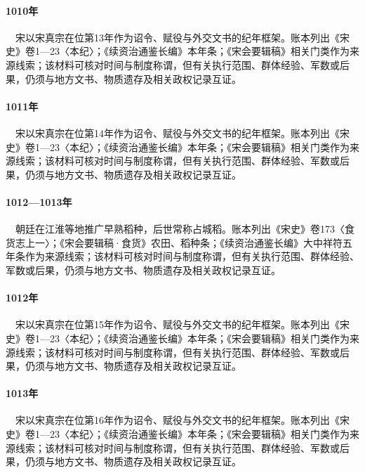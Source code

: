 \paragraph{1010年}　宋以宋真宗在位第13年作为诏令、赋役与外交文书的纪年框架。账本列出《宋史》卷1—23〈本纪〉；《续资治通鉴长编》本年条；《宋会要辑稿》相关门类作为来源线索；该材料可核对时间与制度称谓，但有关执行范围、群体经验、军数或后果，仍须与地方文书、物质遗存及相关政权记录互证。

\paragraph{1011年}　宋以宋真宗在位第14年作为诏令、赋役与外交文书的纪年框架。账本列出《宋史》卷1—23〈本纪〉；《续资治通鉴长编》本年条；《宋会要辑稿》相关门类作为来源线索；该材料可核对时间与制度称谓，但有关执行范围、群体经验、军数或后果，仍须与地方文书、物质遗存及相关政权记录互证。

\paragraph{1012—1013年}　朝廷在江淮等地推广早熟稻种，后世常称占城稻。账本列出《宋史》卷173〈食货志上一〉；《宋会要辑稿·食货》农田、稻种条；《续资治通鉴长编》大中祥符五年条作为来源线索；该材料可核对时间与制度称谓，但有关执行范围、群体经验、军数或后果，仍须与地方文书、物质遗存及相关政权记录互证。

\paragraph{1012年}　宋以宋真宗在位第15年作为诏令、赋役与外交文书的纪年框架。账本列出《宋史》卷1—23〈本纪〉；《续资治通鉴长编》本年条；《宋会要辑稿》相关门类作为来源线索；该材料可核对时间与制度称谓，但有关执行范围、群体经验、军数或后果，仍须与地方文书、物质遗存及相关政权记录互证。

\paragraph{1013年}　宋以宋真宗在位第16年作为诏令、赋役与外交文书的纪年框架。账本列出《宋史》卷1—23〈本纪〉；《续资治通鉴长编》本年条；《宋会要辑稿》相关门类作为来源线索；该材料可核对时间与制度称谓，但有关执行范围、群体经验、军数或后果，仍须与地方文书、物质遗存及相关政权记录互证。

